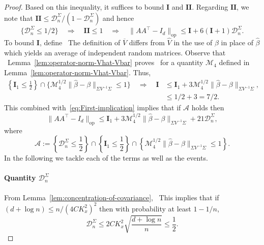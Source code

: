 \documentclass{article}
\begin{document}
\begin{appendices}
\begin{proof}
 
 Based on this inequality, it suffices to bound $\mathbf{I}$ and $\mathbf{II}$.
 Regarding $\mathbf{II}$, we note that $\mathbf{II} \le \mathcal{D}_n^{\Sigma}/(1 - \mathcal{D}_n^{\Sigma})$ and hence
 \begin{equation}\label{eq:First-implication}
 \{\mathcal{D}_n^{\Sigma} \le 1/2\}\quad\Rightarrow\quad \mathbf{II}\le1\quad\Rightarrow\quad \|AA^{\top} - I_d\|_{\mathrm{op}} \le \mathbf{I} + 6(\mathbf{I} + 1)\mathcal{D}_n^{\Sigma}.
 \end{equation} To bound $\mathbf{I}$, define
 \
 The definition of $\overline{V}$ differs from $\widehat{V}$ in the use of $\beta$ in place of $\widehat{\beta}$ which yields an average of independent random matrices. Observe that
 \
 Lemma~\ref{lem:operator-norm-Vhat-Vbar} proves
 \
 for a quantity $\mathcal{M}_4$ defined in Lemma~\ref{lem:operator-norm-Vhat-Vbar}. Thus, 
 \begin{equation}\label{eq:Second-implication}
 \begin{split}
 \left\{\mathbf{I}_1 \le \frac{1}{2}\right\}\cap\{\mathcal{M}_4^{1/2}\|\widehat{\beta} - \beta\|_{\Sigma V^{-1}\Sigma} \le 1\}\quad\Rightarrow\quad\mathbf{I} &\le \mathbf{I}_1 + 3\mathcal{M}_4^{1/2}\|\widehat{\beta} - \beta\|_{\Sigma V^{-1}\Sigma},\\
 &\le 1/2 + 3 = 7/2.
 \end{split}
 \end{equation}
 This combined with~\eqref{eq:First-implication} implies that if $\mathcal{A}$ holds then
 \begin{equation}\label{eq:main-decomposition-sandwich}
 \|AA^{\top} - I_d\|_{\mathrm{op}} \le \mathbf{I}_1 + 3\mathcal{M}_4^{1/2}\|\widehat{\beta} - \beta\|_{\Sigma V^{-1}\Sigma} + 21\mathcal{D}_n^{\Sigma},
 \end{equation}
 where
 \begin{equation}\label{eq:crucial-event-sandwich}
 \mathcal{A} := \left\{\mathcal{D}_n^{\Sigma} \le \frac{1}{2}\right\}\cap\left\{\mathbf{I}_1 \le \frac{1}{2}\right\}\cap\left\{\mathcal{M}_4^{1/2}\|\widehat{\beta} - \beta\|_{\Sigma V^{-1}\Sigma} \le 1\right\}.
 \end{equation}
 In the following we tackle each of the terms as well as the events.
 \paragraph{Quantity $\mathcal{D}_n^{\Sigma}$} From Lemma~\ref{lem:concentration-of-covariance},
 \
 This implies that if $(d + \log n) \le n/(4CK_x^2)^2$ then with probability at least $1 - 1/n$, 
 \begin{equation}\label{eq:quantity-D-Sigma}
 \mathcal{D}_n^{\Sigma} \le 2CK_x^2\sqrt{\frac{d + \log n}{n}} \le \frac{1}{2}.
 \end{equation}

\end{proof}
\end{appendices}
\end{document}
